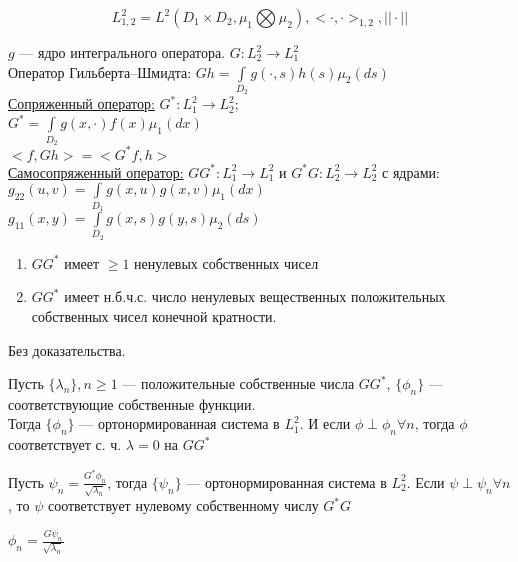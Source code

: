 \begin{equation*}
L_{1,2}^2 = L^2(D_1 \times D_2,\mu_1 \bigotimes \mu_2), <\cdot,\cdot>_{1,2},  ||\cdot||
\end{equation*}

$g$ --- ядро интегрального оператора. $G: L_2^2 \longrightarrow L_1^2$\\

Оператор Гильберта--Шмидта: $Gh = \int \limits_{D_2} g(\cdot,s) h(s) \mu_2(ds)$\\

\underline{Сопряженный оператор:} $G^{*}: L_1^2 \longrightarrow L_2^2$; \\
$G^{*} = \int \limits_{D_2}	g(x,\cdot) f(x) \mu_1(dx)$\\
$< f, Gh > = < G^{*}f, h >$\\

\underline{Самосопряженный оператор:} $GG^{*}: L_1^2 \longrightarrow L_1^2$ и $G^{*}G: L_2^2 \longrightarrow L_2^2$ с ядрами:\\
$g_{22}(u,v) = \int \limits_{D_1} g(x,u) g(x,v) \mu_1(dx)$\\
$g_{11}(x,y) = \int \limits_{D_2} g(x,s) g(y,s) \mu_2(ds)$\\

\begin{thm}
\begin{enumerate}
\item $GG^{*}$ имеет $\geqslant 1$ ненулевых собственных чисел
\item $GG^{*}$ имеет н.б.ч.с. число ненулевых вещественных положительных собственных чисел конечной кратности. 
\end{enumerate}
\end{thm}
Без доказательства.

\begin{prop}[1]
Пусть $\{\lambda_n\}, n \geqslant 1$ --- положительные собственные числа $GG^{*}$, $\{\phi_n\}$ --- соответствующие собственные функции.\\
Тогда $\{\phi_n\}$ --- ортонормированная система в $L_1^2$. И если $\phi \perp \phi_n \forall n$, тогда $\phi$ соответствует с. ч. $\lambda = 0$ на $GG^{*}$
\end{prop}
\begin{prop}[2]
Пусть $\psi_n = \frac{G^{*}\phi_n}{\sqrt{\lambda_n}}$, тогда $\{\psi_n\}$ --- ортонормированная система в $L_2^2$.
Если $\psi \perp \psi_n \forall n$, то $\psi$ соответствует нулевому собственному числу $G^{*}G$
\end{prop}
\begin{prop}[3]
$\phi_n = \frac{G\psi_n}{\sqrt{\lambda_n}}$
\end{prop} 

